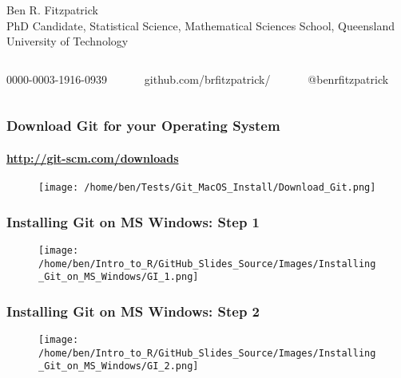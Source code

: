 \documentclass[xcolor=dvipsnames]{beamer}
\begin{document}
\begin{frame}
\begin{figure}
\begin{columns}
\end{columns}
\end{figure}

\small Ben R. Fitzpatrick\\
\tiny PhD Candidate, Statistical Science, Mathematical Sciences School, Queensland University of Technology
\newline
\begin{columns}
\begin{column}{3cm}
\tiny 0000-0003-1916-0939
\end{column}
\begin{column}{3cm}
\tiny github.com/brfitzpatrick/
\end{column}
\begin{column}{3cm}
\tiny @benrfitzpatrick
\end{column}
\end{columns}
\end{frame}

\begin{frame}
\frametitle{Download Git for your Operating System}
\framesubtitle{\url{http://git-scm.com/downloads}}
\begin{center}
\begin{figure}
\texttt{[image: /home/ben/Tests/Git\_MacOS\_Install/Download\_Git.png]}
\end{figure}
\end{center}
\end{frame}

\begin{frame}
\frametitle{Installing Git on MS Windows: Step 1}
\begin{center}
\begin{figure}
\texttt{[image: /home/ben/Intro\_to\_R/GitHub\_Slides\_Source/Images/Installing\_Git\_on\_MS\_Windows/GI\_1.png]}
\end{figure}
\end{center}
\end{frame}

\begin{frame}
\frametitle{Installing Git on MS Windows: Step 2}
\begin{center}
\begin{figure}
\texttt{[image: /home/ben/Intro\_to\_R/GitHub\_Slides\_Source/Images/Installing\_Git\_on\_MS\_Windows/GI\_2.png]}
\end{figure}
\end{center}
\end{frame}
\end{document}
